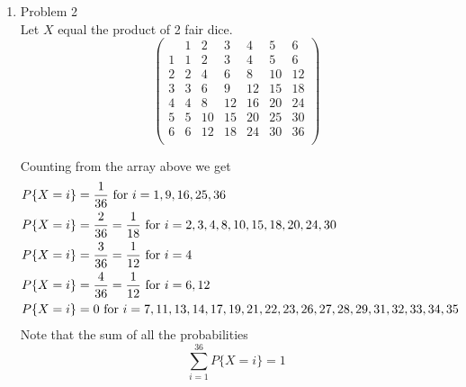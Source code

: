 \documentclass[11pt]{article}
\begin{document}
\begin{enumerate}
\item Problem 2\\
Let $X$ equal the product of 2 fair dice.
$$\left(\begin{array}{c|cccccc}
		&1	&2	&3	&4	&5	&6	\\
\hline
	1	&1	&2	&3	&4	&5	&6	\\	
	2	&2	&4	&6	&8	&10	&12	\\	
	3	&3	&6	&9	&12	&15	&18	\\	
	4	&4	&8	&12	&16	&20	&24	\\	
	5	&5	&10	&15	&20	&25	&30	\\	
	6	&6	&12	&18	&24	&30	&36	\\	
							\end{array}\right)$$

Counting from the array above we get	
\begin{align*}
&P\{X=i\} = \frac{1}{36} \textnormal{ for } i=1,9,16,25,36\\
&P\{X=i\} = \frac{2}{36} = \frac{1}{18} \textnormal{ for } i=2,3,4,8,10,15,18,20,24,30\\
&P\{X=i\} = \frac{3}{36}=\frac{1}{12} \textnormal{ for } i=4\\
&P\{X=i\} = \frac{4}{36}=\frac{1}{12} \textnormal{ for } i=6,12\\
&P\{X=i\}=0 \textnormal{ for } i=7,11,13,14,17,19,21,22,23,26,27,28,29,31,32,33,34,35\\ 
\end{align*}
Note that the sum of all the probabilities 
$$\sum_{i=1}^{36} P\{X=i\} = 1$$


\end{enumerate}
\end{document}
